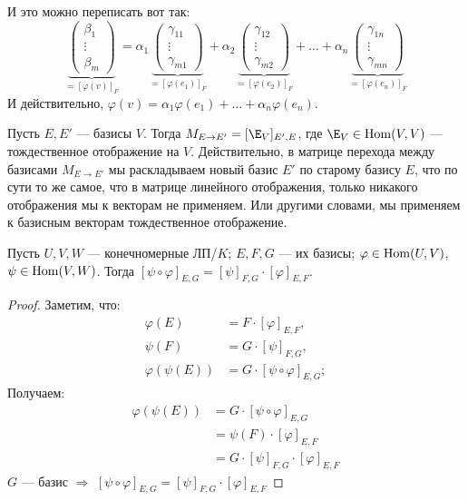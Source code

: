 И это можно переписать вот так:
$$
\underbrace{
\begin{pmatrix}
    \beta_1 \\
    \vdots \\ 
    \beta_m
\end{pmatrix}
}_{=[\varphi(v)]_F}
=
\alpha_1
\underbrace{
\begin{pmatrix}
    \gamma_{11} \\ 
    \vdots \\ 
    \gamma_{m1}
\end{pmatrix}
}_{=[\varphi(e_1)]_F}
+
\alpha_2
\underbrace{
\begin{pmatrix}
    \gamma_{12} \\ 
    \vdots \\ 
    \gamma_{m2}
\end{pmatrix}
}_{=[\varphi(e_2)]_F}
+
\dots
+
\alpha_n
\underbrace{
\begin{pmatrix}
    \gamma_{1n} \\ 
    \vdots \\ 
    \gamma_{mn}
\end{pmatrix}
}_{=[\varphi(e_n)]_F}
$$
И действительно, 
$\varphi(v) = \alpha_1 \varphi(e_1) + \dots + \alpha_n \varphi(e_n)$.

\notice Пусть $E, E'$ --- базисы $V$. Тогда $M_{E \to E'} =
[\E_V]_{E', E}$, где $\E_V \in \Hom(V, V)$ --- тождественное отображение на $V$.
Действительно, в матрице перехода между базисами 
$M_{E \to E'}$ мы раскладываем новый базис $E'$ по старому базису $E$,
что по сути то же самое, что в матрице линейного отображения, только
никакого отображения мы к векторам не применяем. Или другими словами,
мы применяем к базисным векторам тождественное отображение.

\begin{theorem}
    Пусть $U, V, W$ --- конечномерные ЛП/$K$; $E, F, G$ --- их базисы;
    $\varphi \in \operatorname{Hom}(U, V)$, $\psi \in \operatorname{Hom}(V, W)$. Тогда
    $[\psi \circ \varphi]_{E,G} = [\psi]_{F,G} \cdot [\varphi]_{E,F}$.
\end{theorem}
\begin{proof}
    Заметим, что:
    \begin{align*}
        \varphi(E) &= F \cdot [\varphi]_{E, F}, \\
        \psi(F) &= G \cdot [\psi]_{F, G}, \\
        \varphi(\psi(E)) &= G \cdot [\psi \circ \varphi]_{E, G};
    \end{align*}
    Получаем:
    \begin{align*}
        \varphi(\psi(E)) &= G \cdot [\psi \circ \varphi]_{E, G} \\
        &= \psi(F) \cdot [\varphi]_{E, F} \\
        &= G \cdot [\psi]_{F, G} \cdot [\varphi]_{E, F}
    \end{align*}
    $G$ --- базис $\Longrightarrow$ 
    $[\psi \circ \varphi]_{E,G} = [\psi]_{F,G} \cdot [\varphi]_{E,F}$
\end{proof}

